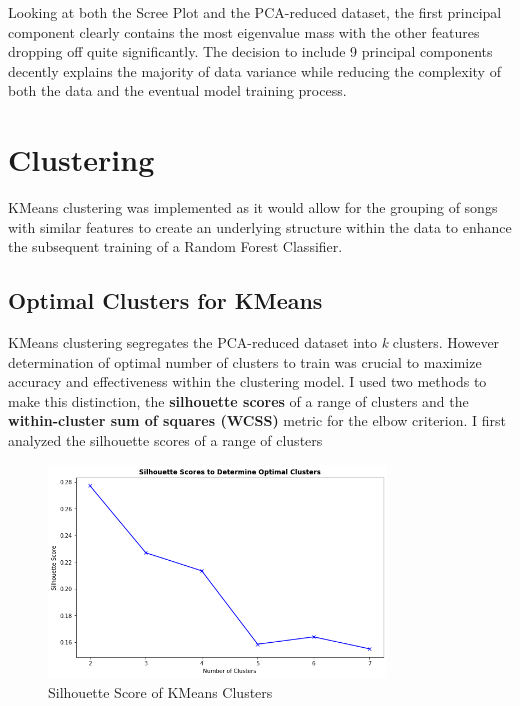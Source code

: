 \documentclass[12pt]{article}
\begin{document}
\noindent
Looking at both the Scree Plot and the PCA-reduced dataset, the first principal component clearly contains the most eigenvalue mass with the other features dropping off quite significantly. The decision to include 9 principal components decently explains the majority of data variance while reducing the complexity of both the data and the eventual model training process.

\section*{\textbf{Clustering}}
KMeans clustering was implemented as it would allow for the grouping of songs with similar features to create an underlying structure within the data to enhance the subsequent training of a Random Forest Classifier.

\subsection*{\textbf{Optimal Clusters for KMeans}}
KMeans clustering segregates the PCA-reduced dataset into \textit{k} clusters. However determination of optimal number of clusters to train was crucial to maximize accuracy and effectiveness within the clustering model. I used two methods to make this distinction, the \textbf{silhouette scores} of a range of clusters and the \textbf{within-cluster sum of squares (WCSS)} metric for the elbow criterion. I first analyzed the silhouette scores of a range of clusters


\begin{figure}[htbp]
  \centering
  \vspace{-0.075cm}
  \includegraphics[width=0.8\textwidth]{kmeans_silhouette.png}
  \caption{Silhouette Score of KMeans Clusters}
  \label{KMeans Silhouette Scores}
\end{figure}
\end{document}
